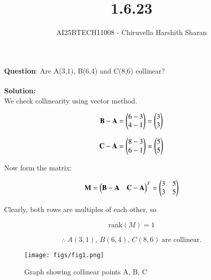 \documentclass[journal]{IEEEtran}
\begin{document}

\vspace{3cm}

\title{1.6.23}
\author{AI25BTECH11008 - Chiruvella Harshith Sharan}
{\let\newpage\relax\maketitle}

\renewcommand{\thefigure}{\theenumi}
\renewcommand{\thetable}{\theenumi}
\setlength{\intextsep}{10pt} 

\renewcommand{\thetable}{\theenumi}

\textbf{Question}: Are A(3,1), B(6,4) and C(8,6) collinear?\\\\

\textbf{Solution:}\\

We check collinearity using vector method.  

\[
\mathbf{B}-\mathbf{A} = \begin{pmatrix}6-3 \\ 4-1\end{pmatrix} = \begin{pmatrix}3 \\ 3\end{pmatrix}
\]  

\[
\mathbf{C}-\mathbf{A} = \begin{pmatrix}8-3 \\ 6-1\end{pmatrix} = \begin{pmatrix}5 \\ 5\end{pmatrix}
\]  

Now form the matrix:  

\[
\mathbf{M} = \begin{pmatrix}\mathbf{B}-\mathbf{A} & \mathbf{C}-\mathbf{A}\end{pmatrix}^T 
= \begin{pmatrix}3 & 5 \\ 3 & 5\end{pmatrix}
\]  

Clearly, both rows are multiples of each other, so  

\[
\text{rank}(M) = 1
\]  

\[
\therefore \; A(3,1), \, B(6,4), \, C(8,6) \; \text{are collinear.}
\]

\begin{figure}[htbp]
    \centering
    \texttt{[image: figs/fig1.png]}
    \caption{Graph showing collinear points A, B, C}
    \label{fig:fig/fig1.png}
\end{figure}
\end{document}

